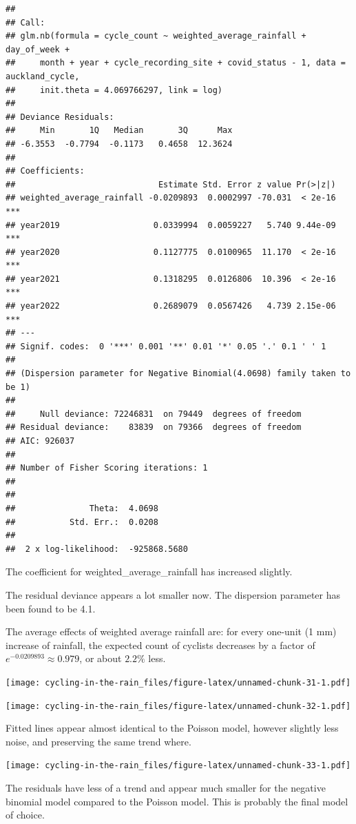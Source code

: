 \documentclass[
]{article}
\begin{document}
\begin{verbatim}
## 
## Call:
## glm.nb(formula = cycle_count ~ weighted_average_rainfall + day_of_week + 
##     month + year + cycle_recording_site + covid_status - 1, data = auckland_cycle, 
##     init.theta = 4.069766297, link = log)
## 
## Deviance Residuals: 
##     Min       1Q   Median       3Q      Max  
## -6.3553  -0.7794  -0.1173   0.4658  12.3624  
## 
## Coefficients:
##                             Estimate Std. Error z value Pr(>|z|)    
## weighted_average_rainfall -0.0209893  0.0002997 -70.031  < 2e-16 ***
## year2019                   0.0339994  0.0059227   5.740 9.44e-09 ***
## year2020                   0.1127775  0.0100965  11.170  < 2e-16 ***
## year2021                   0.1318295  0.0126806  10.396  < 2e-16 ***
## year2022                   0.2689079  0.0567426   4.739 2.15e-06 ***
## ---
## Signif. codes:  0 '***' 0.001 '**' 0.01 '*' 0.05 '.' 0.1 ' ' 1
## 
## (Dispersion parameter for Negative Binomial(4.0698) family taken to be 1)
## 
##     Null deviance: 72246831  on 79449  degrees of freedom
## Residual deviance:    83839  on 79366  degrees of freedom
## AIC: 926037
## 
## Number of Fisher Scoring iterations: 1
## 
## 
##               Theta:  4.0698 
##           Std. Err.:  0.0208 
## 
##  2 x log-likelihood:  -925868.5680
\end{verbatim}

The coefficient for weighted\_average\_rainfall has increased slightly.

The residual deviance appears a lot smaller now. The dispersion
parameter has been found to be 4.1.

The average effects of weighted average rainfall are: for every one-unit
(1 mm) increase of rainfall, the expected count of cyclists decreases by
a factor of \(e^{-0.0209893} \approx 0.979\), or about \(2.2\%\) less.

\texttt{[image: cycling-in-the-rain\_files/figure-latex/unnamed-chunk-31-1.pdf]}

\texttt{[image: cycling-in-the-rain\_files/figure-latex/unnamed-chunk-32-1.pdf]}

Fitted lines appear almost identical to the Poisson model, however
slightly less noise, and preserving the same trend where.

\texttt{[image: cycling-in-the-rain\_files/figure-latex/unnamed-chunk-33-1.pdf]}

The residuals have less of a trend and appear much smaller for the
negative binomial model compared to the Poisson model. This is probably
the final model of choice.
\end{document}
